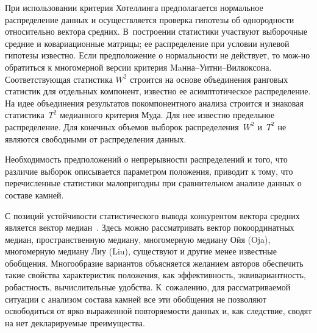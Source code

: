 \begin{multicols}{2}
      При использовании критерия Хотеллинга предполагается нормальное распределение 
данных и осуществляется проверка гипотезы об одно\-род\-ности относительно вектора 
средних. В~по\-стро\-ении статистики участвуют выборочные средние и ковариационные 
матрицы; ее распределение при условии нулевой гипотезы известно. Если пред\-положение о 
нормальности не действует, то мож-\linebreak но обратиться к многомерной версии критерия\linebreak 
      Maн\-на--Уит\-ни--Вил\-кок\-со\-на. Соответствующая ста\-тистика $W^2$ строится на 
основе объединения ранговых статистик для отдельных компонент, известно ее 
асимптотическое распределение. На идее объединения результатов покомпонентного 
анализа строится и знаковая статистика~$T^2$ медианного критерия Муда. Для нее известно 
предельное распределение. Для конечных объемов выборок распределения~$W^2$ и~$T^2$ 
не являются свободными от распределения данных.
      
      Необходимость предположений о непре\-рыв\-ности распределений и того, что различие 
выборок описывается параметром положения, приводит к тому, что перечисленные 
статистики малопригодны при сравнительном анализе данных о составе камней.
      
      С позиций устойчивости статистического вывода конкурентом вектора средних 
является вектор медиан~\cite{9-kri}. Здесь можно рассматривать вектор покоординатных 
медиан, пространственную медиану, многомерную медиану Ойя (Oja), многомерную 
медиану Лиу (Liu), существуют и другие менее известные обобщения. Многообразие 
вариантов объясняется желанием авторов обеспечить такие свойства характеристик 
положения, как эффективность, эквивариантность, робастность, вычислительные удобства. 
К~сожалению, для рассматриваемой ситуации с анализом состава камней все эти обобщения 
не позволяют освободиться от ярко выраженной повторяемости данных и, как следствие, 
сводят на нет декларируемые преимущества.
      

\end{multicols}
